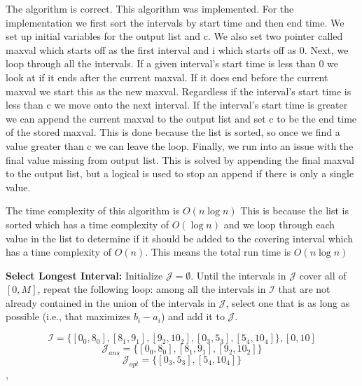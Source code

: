 \documentclass{hw}
\begin{document}
\begin{problem}
    \begin{solution}
        The algorithm is correct. This algorithm was implemented. For the implementation we first sort the intervals by start time and then end time. We set up initial variables for the output list and c. We also set two pointer called max\textunderscore val which starts off as the first interval and i which starts off as 0. Next, we loop through all the intervals. If a given interval's start time is less than 0 we look at if it ends after the current max\textunderscore val. If it does end before the current max\textunderscore val we start this as the new max\textunderscore val. Regardless if the interval's start time is less than c we move onto the next interval. If the interval's start time is greater we can append the current max\textunderscore val to the output list and set c to be the end time of the stored max\textunderscore val. This is done because the list is sorted, so once we find a value greater than c we can leave the loop. Finally, we run into an issue with the final value missing from output list. This is solved by appending the final max\textunderscore val to the output list, but a logical is used to stop an append if there is only a single value.

        The time complexity of this algorithm is $O(n \log n)$ This is because the list is sorted which has a time complexity of $O(\log n)$ and we loop through each value in the list to determine if it should be added to the covering interval which has a time complexity of $O(n)$. This means the total run time is $O(n \log n)$
        
    \end{solution}

  \begin{subproblem}
    \textbf{Select Longest Interval:}
  Initialize $\mathcal{J}=\emptyset$.
  Until the intervals in $\mathcal{J}$ cover all of $[0,M]$,
  repeat the following loop: among all the intervals in
  $\mathcal{I}$ that are not already contained in the union
  of the intervals in $\mathcal{J}$, select one that is as
  long as possible (i.e., that maximizes $b_i-a_i$) and
  add it to $\mathcal{J}$.
  \end{subproblem}

\begin{solution}
$$
\mathcal{I} = \{[0_0,8_0], [8_1,9_1], [9_2,10_2], [0_3,5_3], [5_4,10_4]\}, [0,10]
$$
$$
\mathcal{J}_{ans} = \{[0_0,8_0], [8_1,9_1], [9_2,10_2]\}
$$
$$
\mathcal{J}_{opt} = \{[0_3,5_3], [5_4,10_4]\}
$$
,\end{solution}


\end{problem}
\end{document}
